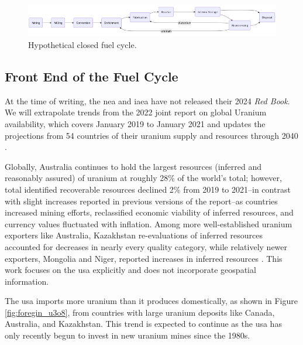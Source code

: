 \begin{figure}[H]
      \centering
      \includegraphics[scale=0.55]{images/nfc/closed_fc.png}
      \caption{Hypothetical closed fuel cycle.}
      \label{fig:closed_fc}
\end{figure}


\subsection{Front End of the Fuel Cycle}
\label{sec:front_end}
At the time of writing, the \gls{nea} and \gls{iaea} have not released their  2024 \textit{Red Book}. We will extrapolate trends from the 2022 joint report on global Uranium availability, which covers January 2019 to January 2021 and updates the projections from 54 countries of their uranium supply and resources through 2040 \cite{nea_red_book_2022}.

Globally, Australia continues to hold the largest resources (inferred and
reasonably assured) of uranium at roughly 28\% of the world's total; however,
total identified recoverable resources declined 2\% from 2019 to 2021--in
contrast with slight increases reported in previous versions of the report--as
countries increased mining efforts, reclassified economic viability of inferred
resources, and currency values fluctuated with inflation. Among more
well-established uranium exporters like Australia, Kazakhstan re-evaluations of
inferred resources accounted for decreases in nearly every quality category,
while relatively newer exporters, Mongolia and Niger, reported increases in
inferred resources \cite{nea_red_book_2022}. This work focuses on the \gls{usa}
explicitly and does not incorporate geospatial information.

The \gls{usa} imports more uranium than it produces domestically, as shown in Figure \ref{fig:foregin_u3o8}, from countries with large uranium deposits like Canada, Australia, and Kazakhstan. This trend is expected to continue as the \gls{usa} has only recently begun to invest in new uranium mines since the 1980s.

